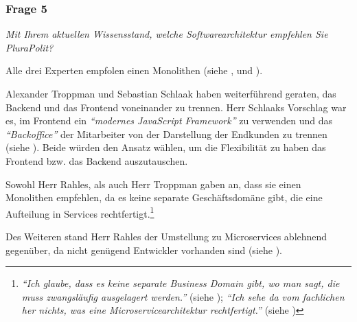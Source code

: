 \subsubsection{Frage 5}
\label{sec:frage5}

\textit{Mit Ihrem aktuellen Wissensstand, welche Softwarearchitektur empfehlen Sie PluraPolit?}

Alle drei Experten empfolen einen Monolithen (siehe ,  und ).

Alexander Troppman und Sebastian Schlaak haben weiterführend geraten, das Backend und das Frontend voneinander zu trennen. Herr Schlaaks Vorschlag war es, im Frontend ein \textit{\enquote{modernes JavaScript Framework}} zu verwenden und das \textit{\enquote{Backoffice}} der Mitarbeiter von der Darstellung der Endkunden zu trennen (siehe ). Beide würden den Ansatz wählen, um die Flexibilität zu haben das Frontend bzw. das Backend auszutauschen.

Sowohl Herr Rahles, als auch Herr Troppman gaben an, dass sie einen Monolithen empfehlen, da es keine separate Geschäftsdomäne gibt, die eine Aufteilung in Services rechtfertigt.\footnote{
\textit{\enquote{Ich glaube, dass es keine separate Business Domain gibt, wo man sagt, die muss zwangsläufig ausgelagert werden.}} (siehe ); \textit{\enquote{Ich sehe da vom fachlichen her nichts, was eine Microservicearchitektur rechtfertigt.}} (siehe )
}

Des Weiteren stand Herr Rahles der Umstellung zu Microservices ablehnend gegenüber, da nicht genügend Entwickler vorhanden sind (siehe ).